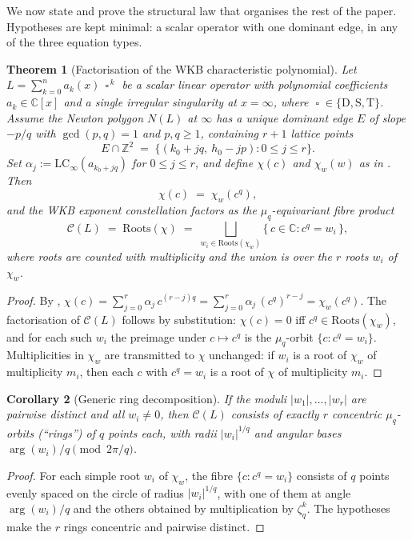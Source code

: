 \documentclass[11pt,a4paper]{article}
\theoremstyle{plain}
\newtheorem{theorem}{Theorem}[section]
\newtheorem{corollary}[theorem]{Corollary}
\theoremstyle{definition}
\theoremstyle{remark}
\newcommand{\op}{\mathop{\square}}                %
\newcommand{\opD}{\mathrm{D}}                     %
\newcommand{\opS}{\mathrm{S}}                     %
\newcommand{\opT}{\mathrm{T}}                     %
\newcommand{\LCinf}{\mathrm{LC}_\infty}
\newcommand{\Roots}{\mathrm{Roots}}
\newcommand{\NL}{N(L)}
\newcommand{\Cl}{\mathcal{C}}
\DeclareMathOperator{\arginline}{arg}
\begin{document}
We now state and prove the structural law that organises the rest of the
paper. Hypotheses are kept minimal: a scalar operator with one dominant
edge, in any of the three equation types.

\begin{theorem}[Factorisation of the WKB characteristic polynomial]\label{thm:main}
Let $L = \sum_{k=0}^{n} a_k(x)\, \op^{\,k}$ be a scalar linear operator with
polynomial coefficients $a_k \in \mathbb{C}[x]$ and a single irregular
singularity at $x = \infty$, where $\op \in \{\opD, \opS, \opT\}$. Assume
the Newton polygon $\NL$ at $\infty$ has a unique dominant edge $E$ of
slope $-p/q$ with $\gcd(p, q) = 1$ and $p, q \ge 1$, containing $r + 1$
lattice points
\[
   E \cap \mathbb{Z}^2 \;=\;
   \big\{(k_0 + jq,\ h_0 - jp) : 0 \le j \le r\big\}.
\]
Set $\alpha_j := \LCinf(a_{k_0 + jq})$ for $0 \le j \le r$, and define
$\chi(c)$ and $\chi_w(w)$ as in . Then
\[
   \boxed{\,
     \chi(c) \;=\; \chi_w(c^q),
   \,}
\]
and the WKB exponent constellation factors as the $\mu_q$-equivariant
fibre product
\[
   \Cl(L) \;=\; \Roots(\chi)
   \;=\;
   \bigsqcup_{w_i \in \Roots(\chi_w)}
   \big\{\, c \in \mathbb{C} : c^q = w_i \,\big\},
\]
where roots are counted with multiplicity and the union is over the $r$
roots $w_i$ of $\chi_w$.
\end{theorem}

\begin{proof}
By ,
$\chi(c) = \sum_{j=0}^{r} \alpha_j\, c^{(r-j) q}
       = \sum_{j=0}^{r} \alpha_j\, (c^q)^{r-j}
       = \chi_w(c^q).$
The factorisation of $\Cl(L)$ follows by substitution: $\chi(c) = 0$ iff
$c^q \in \Roots(\chi_w)$, and for each such $w_i$ the preimage under
$c \mapsto c^q$ is the $\mu_q$-orbit $\{c : c^q = w_i\}$. Multiplicities
in $\chi_w$ are transmitted to $\chi$ unchanged: if $w_i$ is a root of
$\chi_w$ of multiplicity $m_i$, then each $c$ with $c^q = w_i$ is a root
of $\chi$ of multiplicity $m_i$.
\end{proof}

\begin{corollary}[Generic ring decomposition]\label{cor:ring}
If the moduli $|w_1|, \dots, |w_r|$ are pairwise distinct and all
$w_i \ne 0$, then $\Cl(L)$ consists of exactly $r$ concentric
$\mu_q$-orbits (``rings'') of $q$ points each, with radii $|w_i|^{1/q}$
and angular bases $\arginline(w_i) / q \pmod{2\pi/q}$.
\end{corollary}

\begin{proof}
For each simple root $w_i$ of $\chi_w$, the fibre $\{c : c^q = w_i\}$
consists of $q$ points evenly spaced on the circle of radius
$|w_i|^{1/q}$, with one of them at angle $\arginline(w_i)/q$ and the others
obtained by multiplication by $\zeta_q^k$. The hypotheses make the
$r$ rings concentric and pairwise distinct.
\end{proof}
\end{document}
